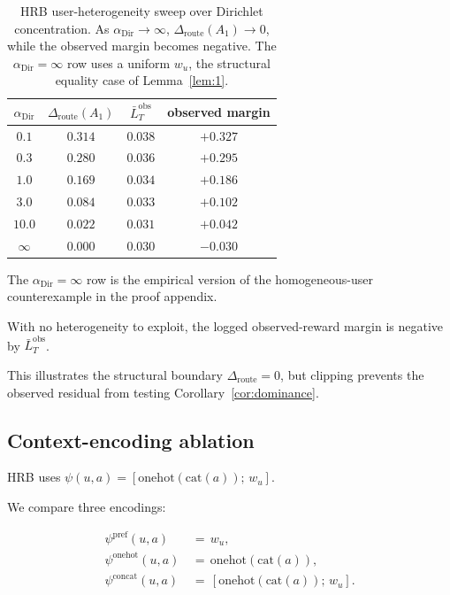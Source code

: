 \documentclass{article} %
\begin{document}
\begin{table}[h]
\centering
\small
\begin{tabular}{cccc}
\toprule
\(\alpha_{\mathrm{Dir}}\) & $\Delta_{\mathrm{route}}(A_1)$ & $\bar L_T^{\mathrm{obs}}$ & observed margin \\
\midrule
$0.1$  & $0.314$ & $0.038$ & $+0.327$ \\
$0.3$  & $0.280$ & $0.036$ & $+0.295$ \\
$1.0$  & $0.169$ & $0.034$ & $+0.186$ \\
$3.0$  & $0.084$ & $0.033$ & $+0.102$ \\
$10.0$ & $0.022$ & $0.031$ & $+0.042$ \\
$\infty$ & $0.000$ & $0.030$ & $-0.030$ \\
\bottomrule
\end{tabular}
\caption{HRB user-heterogeneity sweep over Dirichlet concentration. As
\(\alpha_{\mathrm{Dir}}\to\infty\),
\(\Delta_{\mathrm{route}}(A_1)\to0\), while the observed margin becomes
negative. The \(\alpha_{\mathrm{Dir}}=\infty\) row uses a uniform \(w_u\), the structural
equality case of Lemma~\ref{lem:1}.}
\label{tab:app-dirichlet}
\end{table}

The \(\alpha_{\mathrm{Dir}}=\infty\) row is the empirical version of the
homogeneous-user counterexample in the proof appendix.

With no heterogeneity to exploit, the logged observed-reward margin is negative
by \(\bar L_T^{\mathrm{obs}}\).

This illustrates the structural boundary \(\Delta_{\mathrm{route}}=0\), but
clipping prevents the observed residual from testing
Corollary~\ref{cor:dominance}.

\subsection{Context-encoding ablation}

\label{app:ctx-type}

HRB uses $\psi(u,a)=[\mathrm{onehot}(\mathrm{cat}(a));\,w_u]$.

We compare three encodings:

\begin{align}
\label{eq:app-ctx-pref}
\psi^{\mathrm{pref}}(u,a) &\,=\, w_u,\\
\label{eq:app-ctx-onehot}
\psi^{\mathrm{onehot}}(u,a) &\,=\, \mathrm{onehot}(\mathrm{cat}(a)),\\
\label{eq:app-ctx-concat}
\psi^{\mathrm{concat}}(u,a) &\,=\, [\mathrm{onehot}(\mathrm{cat}(a));\,w_u].
\end{align}
\end{document}

